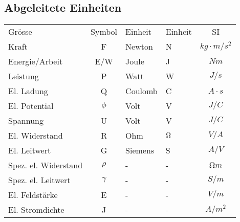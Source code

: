 \begin{sectionbox}
	\subsection{Abgeleitete Einheiten}
		\begin{emphbox}
			\begin{tabular}{lcllc}
				Grösse & Symbol & Einheit & Einheit & SI \\
				Kraft & F & Newton & N & $kg\cdot m/s^2$ \\
				Energie/Arbeit & E/W & Joule & J & $Nm$ \\
				Leistung & P & Watt & W & $J/s$ \\
				El. Ladung & Q & Coulomb & C & $A \cdot s$ \\
				El. Potential & $\phi$ & Volt & V & $J/C$ \\
				Spannung & U & Volt & V & $J/C$ \\
				El. Widerstand & R & Ohm & $\ohm$ & $V/A$ \\
				El. Leitwert & G & Siemens & S & $A/V$ \\
				Spez. el. Widerstand & $\rho$ & - & - & $Ωm$ \\
				Spez. el. Leitwert & $\gamma$ & - & - & $S/m$ \\
				El. Feldstärke & E & - & - & $V/m$ \\
				El. Stromdichte & J & - & - & $A/m^2$ \\
			\end{tabular}
		\end{emphbox}
	
\end{sectionbox}

